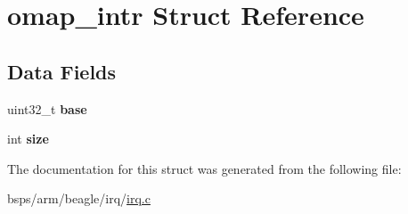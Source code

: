 \hypertarget{structomap__intr}{}\section{omap\+\_\+intr Struct Reference}
\label{structomap__intr}
\subsection*{Data Fields}
\begin{DoxyCompactItemize}
\item 
\mbox{\label{structomap__intr_a18e627632ca4f1296edf4b5e276c0786}} 
uint32\+\_\+t {\bfseries base}
\item 
\mbox{\label{structomap__intr_a9ae3613c191aa910dbc2937e8890984a}} 
int {\bfseries size}
\end{DoxyCompactItemize}


The documentation for this struct was generated from the following file\+:\begin{DoxyCompactItemize}
\item 
bsps/arm/beagle/irq/\mbox{\hyperlink{bsps_2arm_2beagle_2irq_2irq_8c}{irq.\+c}}\end{DoxyCompactItemize}
